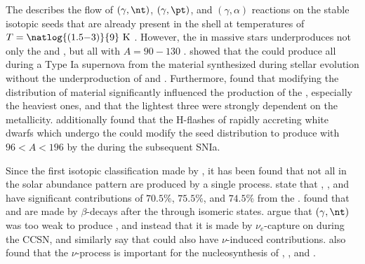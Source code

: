 The \gprn{} describes the flow of $(\gamma,\nt)$, $(\gamma,\pt)$, and $(\gamma,\alpha)$ reactions on the stable isotopic seeds that are already present in the shell at temperatures of $T = \natlog{(1.5{-}3)}{9}~\mathrm{K}$ \citep{rauscherConstrainingAstrophysicalOrigin2013}.
However, the \gprn{} in massive stars underproduces not only the \molybdenum[] and \ruthenium[], but all \pnucn{} with $A=90{-}130$ \citep{arnouldPprocessStellarNucleosynthesis2003, woosleyNucleosynthesisRemnantsMassive2007}.
\cite{travaglioTypeIaSupernovae2011} showed that the \gprn{} could produce all \pnucn{} during a Type Ia supernova from the \spr{} material synthesized during stellar evolution without the underproduction of \molybdenum[92,94] and \ruthenium[96,98].
Furthermore, \cite{travaglioTestingRoleSNe2015} found that modifying the distribution of \spr{} material significantly influenced the production of the \pnucn{}, especially the heaviest ones, and that the lightest three were strongly dependent on the metallicity.
\cite{battinoHeavyElementsNucleosynthesis2020} additionally found that the H-flashes of rapidly accreting white dwarfs which undergo the \iprn{} could modify the seed distribution to produce \pnucn{} with $96 < A < 196$ by the \gprn{} during the subsequent SNIa.

Since the first isotopic classification made by \cite{burbidgeSynthesisElementsStars1957}, it has been found that not all \pnucn{} in the solar abundance pattern are produced by a single process.
\cite{bisterzoSprocessLowmetallicityStars2011} state that \gadolinium[152], \erbium[164], and \tantalum[180] have significant contributions of $70.5\%$, $75.5\%$, and $74.5\%$ from the \sprn{}.
\cite{dillmannPProcessSimulationsModified2008} found that \indium[113] and \tin[115] are made by $\beta$-decays after the \rprn{} through isomeric states.
\cite{gorielyPuzzleSynthesisRare2001} argue that $(\gamma,\nt)$ was too weak to produce \lanthanum[138], and instead that it is made by $\nu_e$-capture on \barium[138] during the CCSN, and \cite{arnouldPprocessStellarNucleosynthesis2003} similarly say that \tantalum[180m] could also have $\nu$-induced contributions.
\cite{sieverdingNProcessLightImproved2018} also found that the $\nu$-process is important for the nucleosynthesis of \indium[113], \lanthanum[138], and \tantalum[180m].

